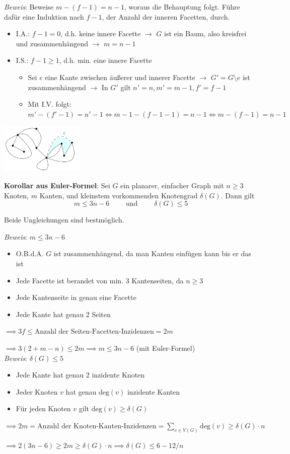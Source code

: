 \textit{Beweis}: Beweise $m-(f-1)=n-1$, woraus die Behauptung folgt. Führe dafür eine Induktion nach $f-1$, der Anzahl der inneren Facetten, durch.
\begin{itemize}
	\item I.A.: $f-1=0$, d.h. keine innere Facette $\rightarrow$ $G$ ist ein Baum, also kreisfrei und zusammenhängend $\rightarrow$ $m=n-1$
	\item I.S.: $f-1\geq 1$, d.h. min. eine innere Facette
	\begin{itemize}
		\item Sei $e$ eine Kante zwischen äußerer und innerer Facette $\rightarrow$ $G'=G\setminus e$ ist zusammenhängend $\rightarrow$ In $G'$ gilt $n'=n,m'=m-1,f'=f-1$
		\item Mit I.V. folgt: $m'-(f'-1)=n'-1\Leftrightarrow m-1-(f-1-1)=n-1 \Leftrightarrow m-(f-1)=n-1$
	\end{itemize}
\end{itemize}
\begin{center}
	\includegraphics[width=0.3\textwidth]{images/euler-proof.png}
\end{center}
\bigskip
\textbf{Korollar aus Euler-Formel}: Sei $G$ ein planarer, einfacher Graph mit $n\geq 3$ Knoten, $m$ Kanten, und kleinstem vorkommenden Knotengrad $\delta(G)$.
Dann gilt 
$$m\leq 3n-6\qquad\text{ und }\qquad \delta(G)\leq 5$$

Beide Ungleichungen sind bestmöglich.

\pagebreak
\textit{Beweis}: $m\leq 3n-6$
\begin{itemize}
	\item O.B.d.A. $G$ ist zusammenhängend, da man Kanten einfügen kann bis er das ist
	\item Jede Facette ist berandet von min. 3 Kantenseiten, da $n\geq 3$ 
	\item Jede Kantenseite in genau eine Facette
	\item Jede Kante hat genau 2 Seiten
\end{itemize}
$\implies 3f\leq \text{Anzahl der Seiten-Facetten-Inzidenzen} =2m$

$\implies 3(2+m-n)\leq 2m \implies m\leq 3n-6$ (mit Euler-Formel)\\

\textit{Beweis}: $\delta(G)\leq 5$
\begin{itemize}
	\item Jede Kante hat genau 2 inzidente Knoten
	\item Jeder Knoten $v$ hat genau $\text{deg}(v)$ inzidente Kanten
	\item Für jeden Knoten $v$ gilt $\text{deg}(v)\geq\delta(G)$
\end{itemize}
$\implies 2m=\text{Anzahl der Knoten-Kanten-Inzidenzen}=\sum\limits_{v\in V(G)}\text{deg}(v)\geq \delta(G)\cdot n$

$\implies 2(3n-6)\geq 2m\geq \delta(G)\cdot n \implies \delta(G)\leq 6-12/n$

